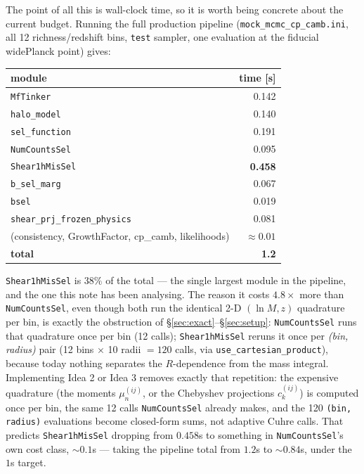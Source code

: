 \documentclass[a4paper, 11pt]{article}
\newcommand{\lnM}{\ln M}
\begin{document}
The point of all this is wall-clock time, so it is worth being
concrete about the current budget. Running the full production
pipeline (\texttt{mock\_mcmc\_cp\_camb.ini}, all 12 richness/redshift
bins, \texttt{test} sampler, one evaluation at the fiducial
widePlanck point) gives:
\begin{center}
\small
\begin{tabular}{l r}
\toprule
module & time [s] \\
\midrule
\texttt{MfTinker}                  & 0.142 \\
\texttt{halo\_model}               & 0.140 \\
\texttt{sel\_function}             & 0.191 \\
\texttt{NumCountsSel}              & 0.095 \\
\texttt{Shear1hMisSel}             & \textbf{0.458} \\
\texttt{b\_sel\_marg}              & 0.067 \\
\texttt{bsel}                      & 0.019 \\
\texttt{shear\_prj\_frozen\_physics} & 0.081 \\
(consistency, GrowthFactor, cp\_camb, likelihoods) & $\approx0.01$ \\
\midrule
\textbf{total} & \textbf{1.2} \\
\bottomrule
\end{tabular}
\end{center}
\texttt{Shear1hMisSel} is $38\%$ of the total --- the single largest
module in the pipeline, and the one this note has been analysing.
The reason it costs $4.8\times$ more than \texttt{NumCountsSel}, even
though both run the identical 2-D $(\lnM,z)$ quadrature per bin, is
exactly the obstruction of \S\ref{sec:exact}--\S\ref{sec:setup}:
\texttt{NumCountsSel} runs that quadrature once per bin (12 calls);
\texttt{Shear1hMisSel} reruns it once per \emph{(bin, radius)} pair
(12 bins $\times$ 10 radii $=120$ calls, via
\texttt{use\_cartesian\_product}), because today nothing separates
the $R$-dependence from the mass integral. Implementing Idea 2 or
Idea 3 removes exactly that repetition: the expensive quadrature
(the moments $\mu_n^{(ij)}$, or the Chebyshev projections
$c_k^{(ij)}$) is computed once per bin, the same 12 calls
\texttt{NumCountsSel} already makes, and the 120 \texttt{(bin,
radius)} evaluations become closed-form sums, not adaptive Cuhre
calls. That predicts \texttt{Shear1hMisSel} dropping from $0.458$s to
something in \texttt{NumCountsSel}'s own cost class, $\sim0.1$s ---
taking the pipeline total from $1.2$s to $\sim0.84$s, under the
$1$s target.
\end{document}
